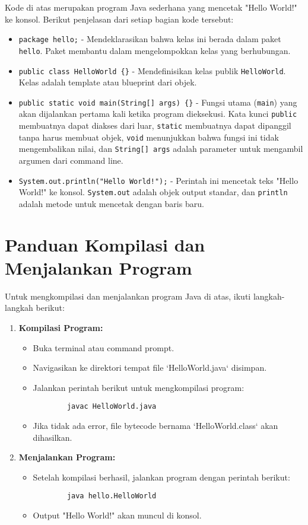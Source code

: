 Kode di atas merupakan program Java sederhana yang mencetak "Hello World!" ke konsol. Berikut penjelasan dari setiap bagian kode tersebut:

\begin{itemize}
\item \texttt{package hello;} - Mendeklarasikan bahwa kelas ini berada dalam paket \texttt{hello}. Paket membantu dalam mengelompokkan kelas yang berhubungan.
\item \texttt{public class HelloWorld \{\}} - Mendefinisikan kelas publik \texttt{HelloWorld}. Kelas adalah template atau blueprint dari objek.
\item \texttt{public static void main(String[] args) \{\}} - Fungsi utama (\texttt{main}) yang akan dijalankan pertama kali ketika program dieksekusi. Kata kunci \texttt{public} membuatnya dapat diakses dari luar, \texttt{static} membuatnya dapat dipanggil tanpa harus membuat objek, \texttt{void} menunjukkan bahwa fungsi ini tidak mengembalikan nilai, dan \texttt{String[] args} adalah parameter untuk mengambil argumen dari command line.
\item \texttt{System.out.println("Hello World!");} - Perintah ini mencetak teks "Hello World!" ke konsol. \texttt{System.out} adalah objek output standar, dan \texttt{println} adalah metode untuk mencetak dengan baris baru.
\end{itemize}

\section{Panduan Kompilasi dan Menjalankan Program}

Untuk mengkompilasi dan menjalankan program Java di atas, ikuti langkah-langkah berikut:

\begin{enumerate}
\item \textbf{Kompilasi Program:}
\begin{itemize}
	\item Buka terminal atau command prompt.
	\item Navigasikan ke direktori tempat file `HelloWorld.java` disimpan.
	\item Jalankan perintah berikut untuk mengkompilasi program:
	\begin{verbatim}
		javac HelloWorld.java
	\end{verbatim}
	\item Jika tidak ada error, file bytecode bernama `HelloWorld.class` akan dihasilkan.
\end{itemize}

\item \textbf{Menjalankan Program:}
\begin{itemize}
	\item Setelah kompilasi berhasil, jalankan program dengan perintah berikut:
	\begin{verbatim}
		java hello.HelloWorld
	\end{verbatim}
	\item Output "Hello World!" akan muncul di konsol.
\end{itemize}
\end{enumerate}


